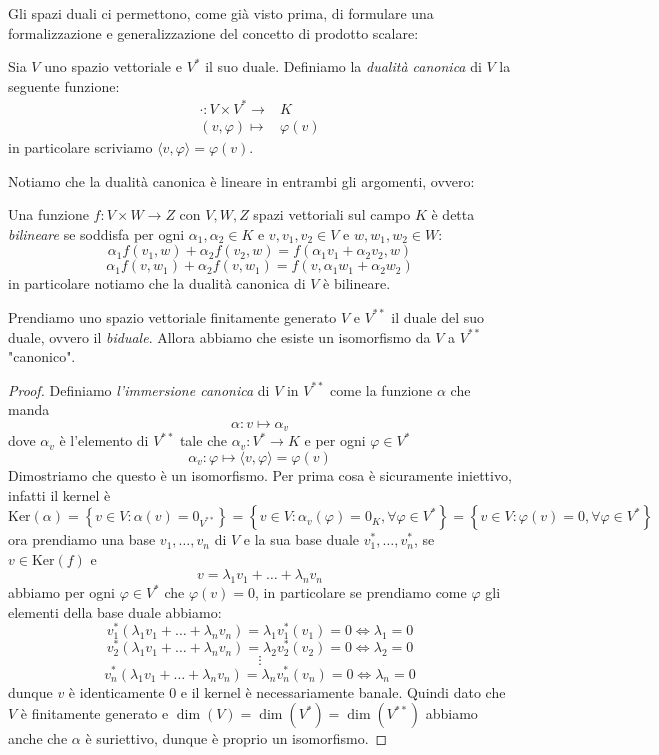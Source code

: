 \documentclass[11pt]{scrartcl}
\renewcommand{\ker}[1]{\text{Ker}\left(#1\right)}
\begin{document}
  	 Gli spazi duali ci permettono, come già visto prima, di formulare una formalizzazione e generalizzazione del concetto di prodotto scalare:
  	 \begin{definition}
  	 	Sia $V$ uno spazio vettoriale e $V^*$ il suo duale. Definiamo la \textit{dualità canonica} di $V$ la seguente funzione:
  	 	\begin{align*}
  	 		\cdot:V\times V^*\to & K \\
  	 		(v,\varphi) \mapsto & \varphi(v)
  	 	\end{align*}
  	 	in particolare scriviamo $\langle v,\varphi \rangle=\varphi(v)$.
  	 \end{definition}
  	 Notiamo che la dualità canonica è lineare in entrambi gli argomenti, ovvero:
  	 \begin{definition}
  	 	Una funzione $f:V\times W\to Z$ con $V,W,Z$ spazi vettoriali sul campo $K$ è detta \textit{bilineare} se soddisfa per ogni $\alpha_1,\alpha_2\in K$ e $v,v_1,v_2\in V$ e $w,w_1,w_2\in W$:
  	 	$$\alpha_1f(v_1,w)+\alpha_2f(v_2,w)=f(\alpha_1v_1+\alpha_2v_2,w)$$
  	 	$$\alpha_1f(v,w_1)+\alpha_2f(v,w_1)=f(v,\alpha_1w_1+\alpha_2w_2)$$
  	 	in particolare notiamo che la dualità canonica di $V$ è bilineare.
  	 \end{definition}
  	 \begin{proposition}
  	 	Prendiamo uno spazio vettoriale finitamente generato $V$ e $V^{**}$ il duale del suo duale, ovvero il \textit{biduale}. Allora abbiamo che esiste un isomorfismo da $V$ a $V^{**}$ "canonico".
  	 \end{proposition}
  	 \begin{proof}
  	 	Definiamo \textit{l'immersione canonica} di $V$ in $V^{**}$ come la funzione $\alpha$ che manda
  	 	$$\alpha:v\mapsto \alpha_v$$
  	 	dove $\alpha_v$ è l'elemento di $V^{**}$ tale che $\alpha_v:V^*\to K$ e per ogni $\varphi\in V^*$
  	 	$$\alpha_v:\varphi \mapsto \langle v,\varphi \rangle=\varphi(v)$$
  	 	Dimostriamo che questo è un isomorfismo. Per prima cosa è sicuramente iniettivo, infatti il kernel è
  	 	$$\ker{\alpha}=\left\{v\in V:\alpha(v)=0_{V^{**}}\right\}=\left\{v\in V:\alpha_v(\varphi)=0_{K},\forall\varphi\in V^*\right\}=\left\{v\in V:\varphi(v)=0,\forall\varphi\in V^*\right\}$$
  	 	ora prendiamo una base $v_1,\dots,v_n$ di $V$ e la sua base duale $v^*_1,\dots,v_n^*$, se $v\in\ker{f}$ e
  	 	$$v=\lambda_1v_1+\dots+\lambda_nv_n$$
  	 	abbiamo per ogni $\varphi\in V^*$ che $\varphi(v)=0$, in particolare se prendiamo come $\varphi$ gli elementi della base duale abbiamo: 
  	 	$$v_1^*(\lambda_1v_1+\dots+\lambda_nv_n)=\lambda_1 v_1^*(v_1)=0 \iff \lambda_1=0$$
  	 	$$v_2^*(\lambda_1v_1+\dots+\lambda_nv_n)=\lambda_2 v_2^*(v_2)=0 \iff \lambda_2=0$$
  	 	$$\vdots$$
  	 	$$v_n^*(\lambda_1v_1+\dots+\lambda_nv_n)=\lambda_n v_n^*(v_n)=0 \iff \lambda_n=0$$
  	 	dunque $v$ è identicamente $0$ e il kernel è necessariamente banale. Quindi dato che $V$ è finitamente generato e $\dim(V)=\dim(V^*)=\dim(V^{**})$ abbiamo anche che $\alpha$ è suriettivo, dunque è proprio un isomorfismo. 
  	 \end{proof}
\end{document}
